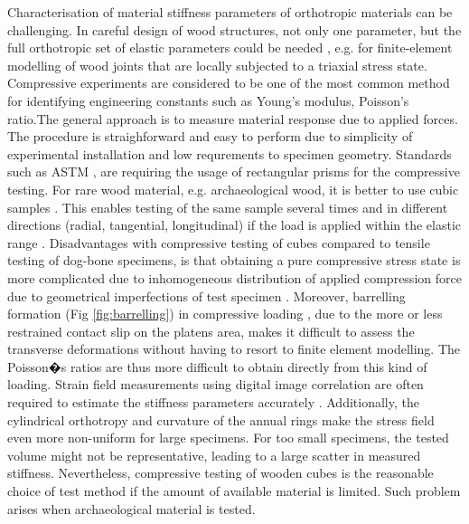 \documentclass[review]{elsarticle}
\begin{document}
Characterisation of material stiffness parameters of orthotropic materials can
be challenging. In  careful design of wood structures, not only one parameter, but the full
orthotropic set of elastic parameters could be needed \cite{tsoumis1991science},
e.g. for finite-element modelling of wood joints that are locally subjected to a triaxial stress state.
Compressive experiments are considered to be one of the most common method for identifying engineering constants such as Young's
modulus, Poisson's ratio.The general approach is to measure material response
due to applied forces. The procedure is straighforward and easy to perform due
to simplicity of experimental installation and low requrements to specimen
geometry. Standards such as ASTM \cite{standard1997d143},
\cite{johnson1983compression} are requiring the usage of rectangular prisms for
the compressive testing.
For rare wood material, e.g. archaeological wood, it is better to use cubic
samples \cite{ljungdahl2007transverse}.
This enables testing of the same sample several times and in different directions (radial, tangential, longitudinal) if the load is applied within the elastic range .
Disadvantages with compressive testing of cubes compared to tensile testing of dog-bone specimens, 
is that obtaining a pure compressive stress state is more complicated due to
inhomogeneous distribution of applied compression force due to geometrical
imperfections of test specimen \cite{Toftegaard1999849}.
Moreover, barrelling formation (Fig \ref{fig:barrelling}) in compressive
loading \cite{oldroyd1966stress}, due to the more or less restrained contact slip on the platens area, makes it difficult to assess the 
transverse deformations without having to resort to finite element modelling.
The Poisson�s ratios are thus more difficult to obtain directly from this kind
of loading.
Strain field measurements using digital image correlation are often required to
estimate the stiffness parameters accurately \cite{dahl2009planar,
majano2012test, ozyhar2013moisture}.
Additionally, the cylindrical orthotropy and curvature of the annual rings make the stress field even more non-uniform for large specimens. 
For too small specimens, the tested volume might not be representative, leading to a large scatter in measured stiffness. 
Nevertheless, compressive testing of wooden cubes is the reasonable choice of test method if the amount of available material is limited. 
Such problem arises when archaeological material is tested.
\end{document}

